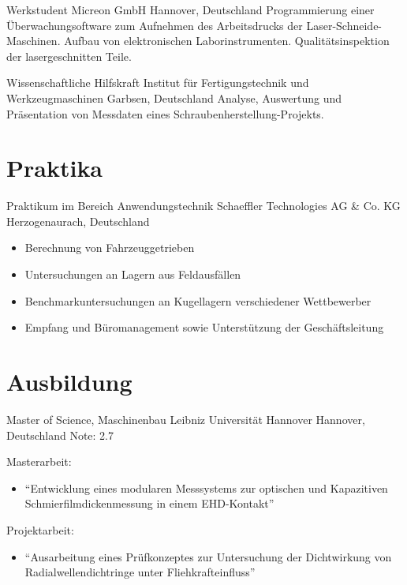 \documentclass[11pt,a4paper,sans]{moderncv}
\begin{document}
{Werkstudent}
{Micreon GmbH}
{Hannover, Deutschland}
{}
{
Programmierung einer Überwachungsoftware zum Aufnehmen des Arbeitsdrucks der Laser-Schneide-Maschinen.
Aufbau von elektronischen Laborinstrumenten.
Qualitätsinspektion der lasergeschnitten Teile.
}

{Wissenschaftliche Hilfskraft}
{Institut für Fertigungstechnik und Werkzeugmaschinen}
{Garbsen, Deutschland}
{}
{
Analyse, Auswertung und Präsentation von Messdaten eines Schraubenherstellung-Projekts.
}

\section{\textbf{Praktika}}
{Praktikum im Bereich Anwendungstechnik}
{Schaeffler Technologies AG \& Co. KG}
{Herzogenaurach, Deutschland}
{}
{
    \begin{itemize}
        \item Berechnung von Fahrzeuggetrieben
        \item Untersuchungen an Lagern aus Feldausfällen
        \item Benchmarkuntersuchungen an Kugellagern verschiedener Wettbewerber
        \item Empfang und Büromanagement sowie Unterstützung der Geschäftsleitung
    \end{itemize}
}

\section{\textbf{Ausbildung}}

{Master of Science, Maschinenbau}
{Leibniz Universität Hannover}
{Hannover, Deutschland}
{Note: 2.7}
{
    Masterarbeit:
    \begin{itemize}
        \item ``Entwicklung eines modularen Messsystems zur optischen und Kapazitiven Schmierfilmdickenmessung in einem EHD-Kontakt''
    \end{itemize}
    Projektarbeit:
    \begin{itemize}
        \item "`Ausarbeitung eines Prüfkonzeptes zur Untersuchung der Dichtwirkung von Radialwellendichtringe unter Fliehkrafteinfluss"'
    \end{itemize}
}
\end{document}
